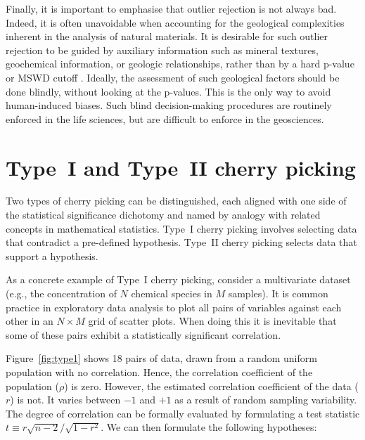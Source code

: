 \documentclass[gchron, manuscript]{copernicus}
\begin{document}
Finally, it is important to emphasise that outlier rejection is not
always bad. Indeed, it is often unavoidable when accounting for the
geological complexities inherent in the analysis of natural
materials. It is desirable for such outlier rejection to be guided by
auxiliary information such as mineral textures, geochemical
information, or geologic relationships, rather than by a hard p-value
or MSWD cutoff \citep{schoene2013}.  Ideally, the assessment of such
geological factors should be done blindly, without looking at the
p-values. This is the only way to avoid human-induced biases. Such
blind decision-making procedures are routinely enforced in the life
sciences, but are difficult to enforce in the geosciences.


\appendix

\section{Type~I and Type~II cherry picking}

Two types of cherry picking can be distinguished, each aligned with
one side of the statistical significance dichotomy and named by
analogy with related concepts in mathematical statistics. Type~I
cherry picking involves selecting data that contradict a pre-defined
hypothesis. Type~II cherry picking selects data that support a
hypothesis.\medskip

As a concrete example of Type~I cherry picking,
consider a multivariate dataset (e.g., the concentration of $N$
chemical species in $M$ samples). It is common practice in exploratory
data analysis to plot all pairs of variables against each other in an
$N\times{M}$ grid of scatter plots. When doing this it is inevitable
that some of these pairs exhibit a statistically significant
correlation.\medskip

Figure~\ref{fig:type1} shows 18 pairs of data, drawn from a random
uniform population with no correlation.  Hence, the correlation
coefficient of the population ($\rho$) is zero.  However, the estimated
correlation coefficient of the data ($r$) is not. It varies between
$-1$ and $+1$ as a result of random sampling variability.  The degree
of correlation can be formally evaluated by formulating a test
statistic $t \equiv r\sqrt{n-2}/\sqrt{1-r^2}$.  We can then formulate
the following hypotheses:
\end{document}

